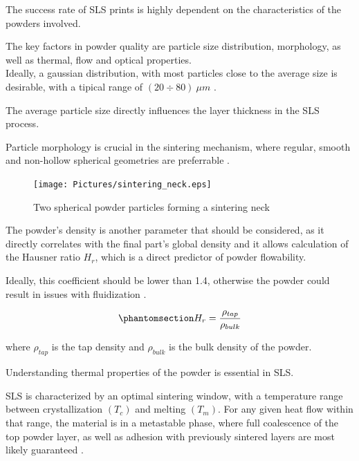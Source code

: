 \documentclass{article}
\begin{document}
    The success rate of SLS prints is highly dependent on the characteristics of the powders involved. 

    The key factors in powder quality are particle size distribution, morphology, as well as thermal, flow and optical properties. \\
    
    Ideally, a gaussian distribution, with most particles close to the average size is desirable, 
    with a tipical range of $(20 \div 80) \ \mu m$ \autocite*{doi:10.1063/1.4918516}. 

    The average particle size directly influences the layer thickness in the SLS process.  
    
    Particle morphology is crucial in the sintering mechanism, where regular, smooth and non-hollow spherical 
    geometries are preferrable \autocite*{doi:10.1063/1.4918516}.  

    \begin{figure}[h!]
        \centering
        \texttt{[image: Pictures/sintering\_neck.eps]}\\
        \caption{Two spherical powder particles forming a sintering neck \autocite{Inkscape}} 
        \label{fig:SLS_sintering_neck}
    \end{figure}

    The powder's density is another parameter that should be considered, as it directly correlates with the final part's 
    global density and it allows calculation of the Hausner ratio $H_r$, which is a direct predictor of powder flowability. 
    
    Ideally, this coefficient should be lower than 1.4, otherwise the powder could result in issues with fluidization \autocite*{doi:10.1063/1.4918516}. 

    \begin{equation}
        \phantomsection
        \label{eq:Hausner_ratio}
        H_r = \frac{\rho_{tap}}{\rho_{bulk}}
    \end{equation} 

    where $\rho_{tap}$ is the tap density and $\rho_{bulk}$ is the bulk density of the powder. 

    \clearpage



    Understanding thermal properties of the powder is essential in SLS. 


    SLS is characterized by an optimal sintering window, with a temperature range between
    crystallization $(T_c)$ and melting $(T_m)$. 
    For any given heat flow within that range, the material is in a metastable phase, 
    where full coalescence of the top powder layer, as well as adhesion with previously sintered layers are 
    most likely guaranteed \autocite{doi:10.1063/1.4918516}. 
\end{document}
